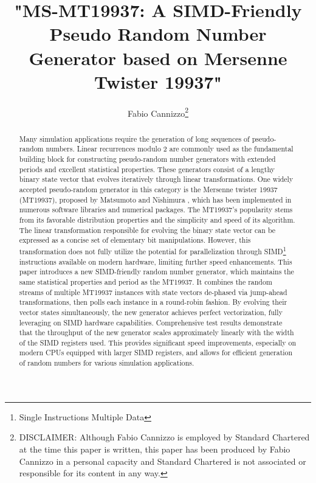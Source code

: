 \documentclass[preprint,1p,times]{elsarticle}
\begin{document}
\newenvironment{myitemize}
{ \begin{itemize} [topsep= 3pt] %
    \setlength{\itemsep}{0pt}
    \setlength{\parskip}{0pt}
    \setlength{\parsep}{0pt}     }
{ \end{itemize}                  }

\newcommand {\inred}[1] {\textcolor{red}{#1}}
\newcommand {\curle}[1]{ \left \{      #1 \right \}      }
\newcommand\XOR{\mathbin{\oplus}}
\newcommand\OR{\mid}
\newcommand\AND{\&}



\begin{frontmatter}
\title{"MS-MT19937: A SIMD-Friendly Pseudo Random Number Generator based on Mersenne Twister 19937"}

\author{\renewcommand*{\thefootnote}{\fnsymbol{footnote}}
	Fabio Cannizzo\footnote{DISCLAIMER: Although Fabio Cannizzo is employed by Standard Chartered at the time this paper is written, this paper has been produced by Fabio Cannizzo in a personal capacity and Standard Chartered is not associated or responsible for its content in any way.}}

\begin{abstract}
Many simulation applications require the generation of long sequences of pseudo-random numbers. Linear recurrences modulo 2 are commonly used as the fundamental building block for constructing pseudo-random number generators with extended periods and excellent statistical properties. These generators consist of a lengthy binary state vector that evolves iteratively through linear transformations. One widely accepted pseudo-random generator in this category is the Mersenne twister 19937 (MT19937), proposed by Matsumoto and Nishimura \cite{mt19937}, which has been implemented in numerous software libraries and numerical packages. The MT19937's popularity stems from its favorable distribution properties and the simplicity and speed of its algorithm. The linear transformation responsible for evolving the binary state vector can be expressed as a concise set of elementary bit manipulations. However, this transformation does not fully utilize the potential for parallelization through SIMD\footnote{Single Instructions Multiple Data} instructions available on modern hardware, limiting further speed enhancements.
This paper introduces a new SIMD-friendly random number generator, which maintains the same statistical properties and period as the MT19937. It combines the random streams of multiple MT19937 instances with state vectors de-phased via jump-ahead transformations, then polls each instance in a round-robin fashion. By evolving their vector states simultaneously, the new generator achieves perfect vectorization, fully leveraging on SIMD hardware capabilities. Comprehensive test results demonstrate that the throughput of the new generator scales approximately linearly with the width of the SIMD registers used. This provides significant speed improvements, especially on modern CPUs equipped with larger SIMD registers, and allows for efficient generation of random numbers for various simulation applications.
\end{abstract}


\end{frontmatter}
\end{document}
